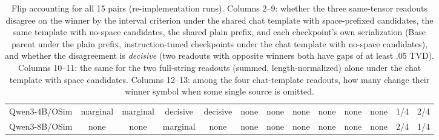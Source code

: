 \begin{table}[t]
\begin{tabular}{@{}lcccccccccccc@{}}
Qwen3-4B/OSim & marginal & marginal & decisive & decisive & none & none & none & none & none & none & 1/4 & 2/4 \\
Qwen3-8B/OSim & none & none & marginal & none & none & none & none & none & none & none & 2/4 & 1/4 \\
\bottomrule
\end{tabular}
\caption{Flip accounting for all 15 pairs (re-implementation runs). Columns 2--9: whether the three same-tensor readouts disagree on the winner by the interval criterion under the shared chat template with space-prefixed candidates, the same template with no-space candidates, the shared plain prefix, and each checkpoint's own serialization (Base parent under the plain prefix, instruction-tuned checkpoints under the chat template with no-space candidates), and whether the disagreement is \emph{decisive} (two readouts with opposite winners both have gaps of at least .05 TVD). Columns 10--11: the same for the two full-string readouts (summed, length-normalized) alone under the chat template with space candidates. Columns 12--13: among the four chat-template readouts, how many change their winner symbol when some single source is omitted.}
\label{tab:flip-accounting}
\end{table}
